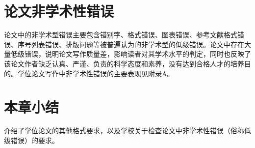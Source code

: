 \section{论文非学术性错误}
论文中的非学术型错误主要包含错别字、格式错误、图表错误、参考文献格式错误、序号列表错误、排版问题等被普遍认为的非学术型的低级错误。论文中存在大量低级错误，说明论文写作质量差，影响读者对其学术水平的判定，同时也反映了该论文作者缺乏认真、严谨、负责的科学态度和素养，没有达到合格人才的培养目的。学位论文写作中非学术性错误的主要表现见附录A。

\section{本章小结}
介绍了学位论文的其他格式要求，以及学校关于检查论文中非学术性错误（俗称低级错误）的要求。







